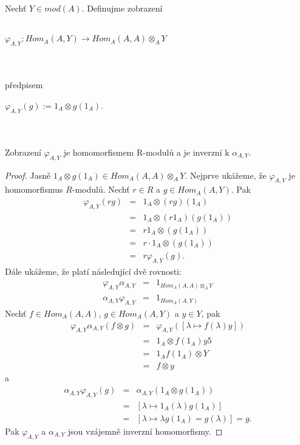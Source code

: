       \begin{lem}\label{lem-varphi-a-y-izo}
        Nechť $Y\in mod(A)$. Definujme zobrazení\\\\
        \centerline{$\varphi_{A,Y}: Hom_A(A,Y) \rightarrow Hom_A(A,A)\otimes_A Y$} 
        \\\\
        předpisem \\
        \centerline{$\varphi_{A,Y}(g):=1_A\otimes g(1_A)$.}\\\\
        Zobrazení $\varphi_{A,Y}$ je homomorfismem R-modulů a je inverzní k $\alpha_{A,Y}$.
      \end{lem}
      \begin{proof}
        Jasně $1_A\otimes g(1_A)\in Hom_A(A,A)\otimes_A Y$. Nejprve ukážeme, že $\varphi_{A,Y}$ 
        je homomorfismus $R$-modulů. Nechť $r\in R$ a $g\in Hom_A(A,Y)$. Pak
        \begin{eqnarray}
          \varphi_{A,Y}(rg)
            &=& 1_A\otimes (rg)(1_A) \nonumber \\
            &=& 1_A\otimes (r1_A)(g(1_A)) \nonumber \\
            &=& r1_A\otimes (g(1_A)) \nonumber \\
            &=& r\cdot 1_A\otimes (g(1_A)) \nonumber \\
            &=& r\varphi_{A,Y}(g). \nonumber
        \end{eqnarray}
        Dále ukážeme, že platí následující dvě rovnosti:
        \begin{eqnarray}
          \varphi_{A,Y} \alpha_{A,Y} &=& 1_{Hom_A(A,A)\otimes_A Y} \nonumber \\
          \alpha_{A,Y} \varphi_{A,Y} &=& 1_{Hom_A(A,Y)} \nonumber 
        \end{eqnarray}
        Nechť $f\in Hom_A(A,A)$,  $g\in Hom_A(A,Y)$ a $y\in Y$, pak 
        \begin{eqnarray}
          \varphi_{A,Y} \alpha_{A,Y}(f\otimes g)
          &=& \varphi_{A,Y}([\lambda\mapsto f(\lambda)y]) \nonumber \\
          &=& 1_A \otimes f(1_A)y5 \nonumber \\
          &=& 1_Af(1_A)\otimes Y \nonumber \\
          &=& f\otimes y \nonumber 
        \end{eqnarray}
        a 
        \begin{eqnarray}
          \alpha_{A,Y} \varphi_{A,Y}(g)
          &=& \alpha_{A,Y} (1_A \otimes g(1_A))  \nonumber \\
          &=& [\lambda\mapsto 1_A(\lambda)g(1_A)]  \nonumber \\
          &=& [\lambda\mapsto \lambda g (1_A)=g(\lambda)]=g.  \nonumber 
        \end{eqnarray}
        Pak $\varphi_{A,Y} $ a $\alpha_{A,Y}$ jsou vzájemně inverzní homomorfismy.
      \end{proof}
      
